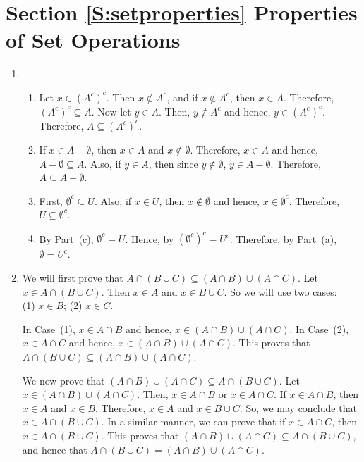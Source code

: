 \section*{Section \ref{S:setproperties} Properties of Set Operations}

\begin{enumerate}
\item \begin{enumerate}
\item Let  $x \in \left( A^c \right)^c$.  Then  $x \notin A^c$, and if $x \notin A^c$, then 
$x \in A$.  Therefore, $\left( A^c \right)^c \subseteq A$.  Now let $y \in A$.  Then, 
$y \notin A^c$ and hence, $y \in \left( A^c \right)^c$.  Therefore, 
$A \subseteq \left( A^c \right)^c$.

\item If $x \in A - \emptyset$, then $x \in A$ and $x \notin \emptyset$.  Therefore, $x \in A$ and hence, $A - \emptyset \subseteq A$.  Also, if $y \in A$, then since $y \notin \emptyset$, 
$y \in A - \emptyset$.  Therefore, $A \subseteq A - \emptyset$.

\item  First, $\emptyset^c \subseteq U$.  Also, if $x \in U$, then $x \notin \emptyset$ and hence, 
$x \in \emptyset^c$.  Therefore, $U \subseteq \emptyset^c$.

\item By Part~(c), $\emptyset^c = U$. Hence, by $\left( \emptyset^c \right)^c = U^c$.  Therefore, by Part~(a), $\emptyset = U^c$.
\end{enumerate}



\item We will first prove that $A \cap \left( B \cup C \right) \subseteq \left( A \cap B \right) 
\cup \left( A \cap C \right)$.  Let $x \in A \cap \left( B \cup C \right)$.  Then $x \in A$ and 
$x \in B \cup C$.  So we will use two cases: \\
(1) $x \in B$; (2) $x \in C$.

In Case~(1), $x \in A \cap B$ and hence, $x \in \left( A \cap B \right) \cup \left( A \cap C \right)$.  In Case~(2), $x \in  A \cap C$ and hence, $x \in \left( A \cap B \right) \cup \left( A \cap C \right)$.  This proves that $A \cap \left( B \cup C \right) \subseteq \left( A \cap B \right) 
\cup \left( A \cap C \right)$.

We now prove that $\left( A \cap B \right) \cup \left( A \cap C \right) \subseteq 
A \cap \left( B \cup C \right)$.  
Let $x \in \left( A \cap B \right) \cup \left( A \cap C \right)$.  Then, $x \in A \cap B$ or 
$x \in A \cap C$.  If $x \in A \cap B$, then $x \in A$ and $x \in B$.  Therefore, $x \in A$ and 
$x \in B \cup C$.  So, we may conclude that $x \in A \cap \left( B \cup C \right)$.  In a similar manner, we can prove that if $x \in A \cap C$, then $x \in A \cap \left( B \cup C \right)$.  This proves that $\left( A \cap B \right) \cup \left( A \cap C \right) \subseteq 
A \cap \left( B \cup C \right)$, and hence that $A \cap \left( B \cup C \right) = \left( A \cap B \right) \cup \left( A \cap C \right)$. 




\end{enumerate}
